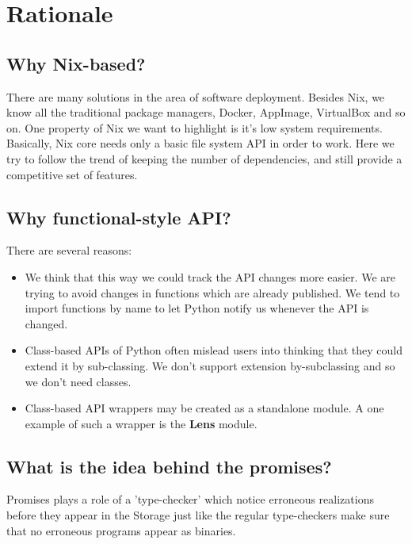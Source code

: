\section{Rationale}

\subsection{Why Nix-based?}

There are many solutions in the area of software deployment.
Besides Nix, we know all the traditional package managers, Docker, AppImage,
VirtualBox and so on. One property of Nix we want to highlight is it's low
system requirements. Basically, Nix core needs only a basic file system API
in order to work. Here we try to follow the trend of keeping the number of
dependencies, and still provide a competitive set of features.

\subsection{Why functional-style API?}

There are several reasons:
\begin{itemize}
  \item We think that this way we could track the API changes more easier. We
    are trying to avoid changes in functions which are already published. We
    tend to import functions by name to let Python notify us whenever the API is
    changed.
  \item Class-based APIs of Python often mislead users into thinking that they
    could extend it by sub-classing. We don't support extension by-subclassing
    and so we don't need classes.
  \item Class-based API wrappers may be created as a standalone module. A one
    example of such a wrapper is the \textbf{Lens} module.
\end{itemize}

\subsection{What is the idea behind the promises?}

Promises plays a role of a 'type-checker' which notice erroneous realizations
before they appear in the Storage just like the regular type-checkers make sure
that no erroneous programs appear as binaries.

